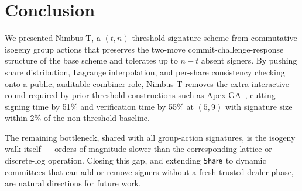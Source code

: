 \section{Conclusion}
\label{sec:conclusion}

We presented Nimbus-T, a $(t,n)$-threshold signature scheme from commutative isogeny group actions that preserves the two-move commit-challenge-response structure of the base scheme and tolerates up to $n-t$ absent signers. By pushing share distribution, Lagrange interpolation, and per-share consistency checking onto a public, auditable combiner role, Nimbus-T removes the extra interactive round required by prior threshold constructions such as Apex-GA~\cite{voss2023apexga}, cutting signing time by 51\% and verification time by 55\% at $(5,9)$ with signature size within 2\% of the non-threshold baseline.

The remaining bottleneck, shared with all group-action signatures, is the isogeny walk itself --- orders of magnitude slower than the corresponding lattice or discrete-log operation. Closing this gap, and extending $\mathsf{Share}$ to dynamic committees that can add or remove signers without a fresh trusted-dealer phase, are natural directions for future work.
